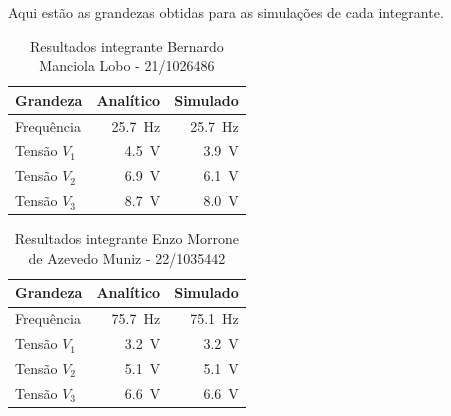\documentclass[11pt,a4paper]{article}
\begin{document}
Aqui estão as grandezas obtidas para as simulações de cada integrante.

\begin{table}[H]
\begin{center}
  \caption{Resultados integrante Bernardo Manciola Lobo - 21/1026486}
  \begin{tabular}{@{}lrr@{}}
    \toprule
    \textbf{Grandeza} & \textbf{Analítico} & \textbf{Simulado} \\
    \midrule
    Frequência   & \SI{25.7}{\hertz} & \SI{25.7}{\hertz} \\
    Tensão $V_1$ & \SI{4.5}{\volt}   & \SI{3.9}{\volt} \\
    Tensão $V_2$ & \SI{6.9}{\volt}   & \SI{6.1}{\volt} \\
    Tensão $V_3$ & \SI{8.7}{\volt}   & \SI{8.0}{\volt} \\
    \bottomrule
  \end{tabular}
\end{center}
\end{table}

\begin{table}[H]
\begin{center}
  \caption{Resultados integrante Enzo Morrone de Azevedo Muniz - 22/1035442}
  \begin{tabular}{@{}lrr@{}}
    \toprule
    \textbf{Grandeza} & \textbf{Analítico} & \textbf{Simulado} \\
    \midrule
    Frequência   & \SI{75.7}{\hertz} & \SI{75.1}{\hertz} \\
    Tensão $V_1$ & \SI{3.2}{\volt}   & \SI{3.2}{\volt} \\
    Tensão $V_2$ & \SI{5.1}{\volt}   & \SI{5.1}{\volt} \\
    Tensão $V_3$ & \SI{6.6}{\volt}   & \SI{6.6}{\volt} \\
    \bottomrule
  \end{tabular}
\end{center}
\end{table}
\end{document}
